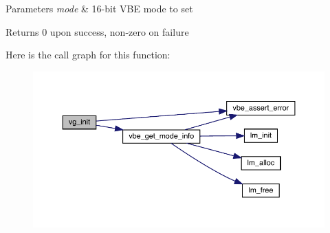 \begin{DoxyParams}{Parameters}
{\em mode} & 16-\/bit V\+BE mode to set\\
\hline
\end{DoxyParams}
\begin{DoxyReturn}{Returns}
0 upon success, non-\/zero on failure 
\end{DoxyReturn}
Here is the call graph for this function\+:\nopagebreak
\begin{figure}[H]
\begin{center}
\leavevmode
\includegraphics[width=350pt]{group__video__gr_ga7d19c24f10ca7bfb2c7b8f9e12d4dc6f_cgraph}
\end{center}
\end{figure}
